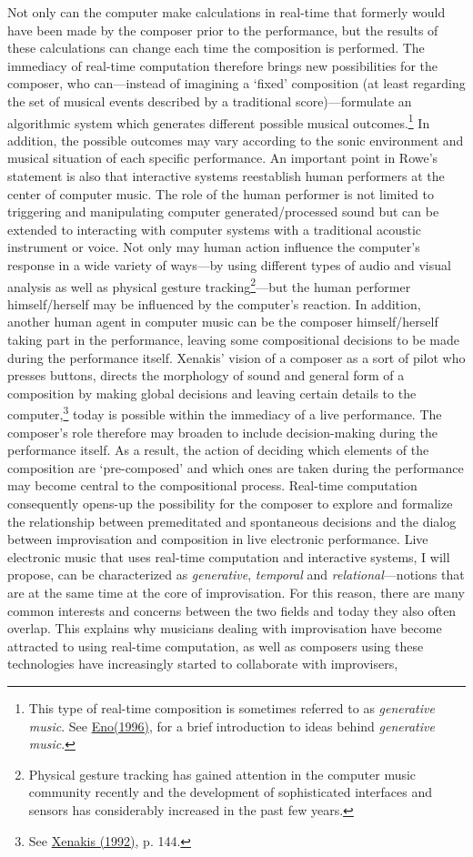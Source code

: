 Not only can the computer make calculations in real-time that formerly would have been made by the composer prior to the performance, but the results of these calculations can change each time the composition is performed. The immediacy of real-time computation therefore brings new possibilities for the composer, who can---instead of imagining a `fixed' composition (at least regarding the set of musical events described by a traditional score)---formulate an algorithmic system which generates different possible musical outcomes.\footnote{This type of real-time composition is sometimes referred to as \emph{generative music}. See \hyperlink{eno}{Eno(1996)}, for a brief introduction to ideas behind \emph{generative music}.} In addition, the possible outcomes may vary according to the sonic environment and musical situation of each specific performance. An important point in Rowe's statement is also that interactive systems reestablish human performers at the center of computer music. The role of the human performer is not limited to triggering and manipulating computer generated/processed sound but can be extended to interacting with computer systems with a traditional acoustic instrument or voice. Not only may human action influence the computer's response in a wide variety of ways---by using different types of audio and visual analysis as well as physical gesture tracking\footnote{Physical gesture tracking has gained attention in the computer music community recently and the development of sophisticated interfaces and sensors has considerably increased in the past few years.}---but the human performer himself/herself may be influenced by the computer's reaction. In addition, another human agent in computer music can be the composer himself/herself taking part in the performance, leaving some compositional decisions to be made during the performance itself. Xenakis' vision of a composer as a sort of pilot who presses buttons, directs the morphology of sound and general form of a composition by making global decisions and leaving certain details to the computer,\footnote{See \hyperlink{xenakis}{Xenakis (1992)}, p. 144.} today is possible within the immediacy of a live performance. The composer's role therefore may broaden to include decision-making during the performance itself. As a result, the action of deciding which elements of the composition are `pre-composed' and which ones are taken during the performance may become central to the compositional process. Real-time computation consequently opens-up the possibility for the composer to explore and formalize the relationship between premeditated and spontaneous decisions and the dialog between improvisation and composition in live electronic performance. Live electronic music that uses real-time computation and interactive systems, I will propose, can be characterized as \emph{generative}, \emph{temporal} and \emph{relational}---notions that are at the same time at the core of improvisation. For this reason, there are many common interests and concerns between the two fields and today they also often overlap. This explains why musicians dealing with improvisation have become attracted to using real-time computation, as well as composers using these technologies have increasingly started to collaborate with improvisers, 
